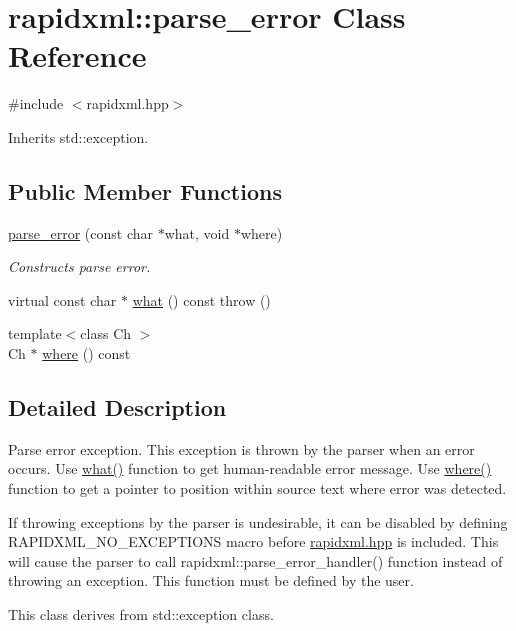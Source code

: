 \hypertarget{classrapidxml_1_1parse__error}{
\section{rapidxml::parse\_\-error Class Reference}
\label{df/dc7/classrapidxml_1_1parse__error}
}


{\ttfamily \#include $<$rapidxml.hpp$>$}



Inherits std::exception.

\subsection*{Public Member Functions}
\begin{DoxyCompactItemize}
\item 
\hyperlink{classrapidxml_1_1parse__error_aea12a301271c393fb627b368fb9f35c1}{parse\_\-error} (const char $\ast$what, void $\ast$where)
\begin{DoxyCompactList}\small\item\em Constructs parse error. \item\end{DoxyCompactList}\item 
virtual const char $\ast$ \hyperlink{classrapidxml_1_1parse__error_a7665c88639e7466ee1de388a4f85e6fe}{what} () const   throw ()
\item 
{\footnotesize template$<$class Ch $>$ }\\Ch $\ast$ \hyperlink{classrapidxml_1_1parse__error_af77cc23decce473c3b5682965a4e193a}{where} () const 
\end{DoxyCompactItemize}


\subsection{Detailed Description}
Parse error exception. This exception is thrown by the parser when an error occurs. Use \hyperlink{classrapidxml_1_1parse__error_a7665c88639e7466ee1de388a4f85e6fe}{what()} function to get human-\/readable error message. Use \hyperlink{classrapidxml_1_1parse__error_af77cc23decce473c3b5682965a4e193a}{where()} function to get a pointer to position within source text where error was detected. \par
\par
 If throwing exceptions by the parser is undesirable, it can be disabled by defining RAPIDXML\_\-NO\_\-EXCEPTIONS macro before \hyperlink{rapidxml_8hpp}{rapidxml.hpp} is included. This will cause the parser to call rapidxml::parse\_\-error\_\-handler() function instead of throwing an exception. This function must be defined by the user. \par
\par
 This class derives from {\ttfamily std::exception} class. 

